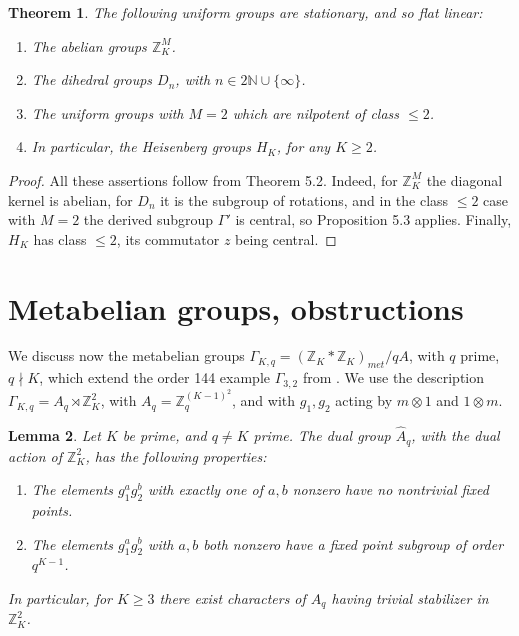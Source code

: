 \documentclass[12pt]{amsart}
\newtheorem{theorem}{Theorem}[section]
\newtheorem{lemma}[theorem]{Lemma}
\theoremstyle{definition}
\begin{document}
\begin{theorem}
The following uniform groups are stationary, and so flat linear:
\begin{enumerate}
\item The abelian groups $\mathbb Z_K^M$.

\item The dihedral groups $D_n$, with $n\in2\mathbb N\cup\{\infty\}$.

\item The uniform groups with $M=2$ which are nilpotent of class $\leq2$.

\item In particular, the Heisenberg groups $H_K$, for any $K\geq2$.
\end{enumerate}
\end{theorem}

\begin{proof}
All these assertions follow from Theorem 5.2. Indeed, for $\mathbb Z_K^M$ the diagonal kernel is abelian, for $D_n$ it is the subgroup of rotations, and in the class $\leq2$ case with $M=2$ the derived subgroup $\Gamma'$ is central, so Proposition 5.3 applies. Finally, $H_K$ has class $\leq2$, its commutator $z$ being central.
\end{proof}

\section{Metabelian groups, obstructions}

We discuss now the metabelian groups $\Gamma_{K,q}=(\mathbb Z_K*\mathbb Z_K)_{met}/qA$, with $q$ prime, $q\nmid K$, which extend the order 144 example $\Gamma_{3,2}$ from \cite{bc2}. We use the description $\Gamma_{K,q}=A_q\rtimes\mathbb Z_K^2$, with $A_q=\mathbb Z_q^{(K-1)^2}$, and with $g_1,g_2$ acting by $m\otimes1$ and $1\otimes m$.

\begin{lemma}
Let $K$ be prime, and $q\neq K$ prime. The dual group $\widehat{A}_q$, with the dual action of $\mathbb Z_K^2$, has the following properties:
\begin{enumerate}
\item The elements $g_1^ag_2^b$ with exactly one of $a,b$ nonzero have no nontrivial fixed points.

\item The elements $g_1^ag_2^b$ with $a,b$ both nonzero have a fixed point subgroup of order $q^{K-1}$.
\end{enumerate}
In particular, for $K\geq3$ there exist characters of $A_q$ having trivial stabilizer in $\mathbb Z_K^2$.
\end{lemma}
\end{document}
